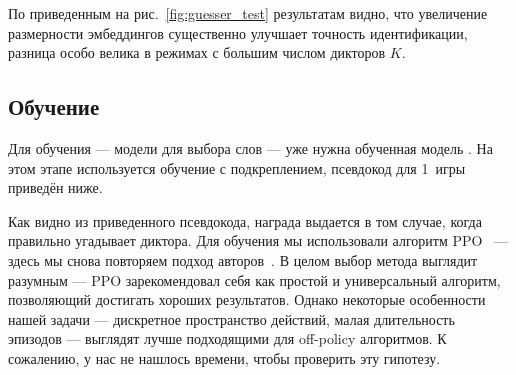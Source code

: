 По приведенным на рис.~\ref{fig:guesser_test} результатам видно, что увеличение размерности
эмбеддингов существенно улучшает точность идентификации, разница особо
велика в режимах с большим числом дикторов $K$.

\subsection{Обучение \enquirer{}}

Для обучения \enquirer{} --- модели для выбора слов --- уже нужна обученная
модель \guesser{}. На этом этапе используется обучение с подкреплением,
псевдокод для 1~игры приведён ниже.

Как видно из приведенного псевдокода, награда выдается в том случае, когда
\guesser{} правильно угадывает диктора. Для обучения мы использовали алгоритм
PPO~\cite{schulman2017proximal} --- здесь мы снова повторяем подход
авторов~\citeisr{}. В целом выбор метода выглядит разумным --- PPO
зарекомендовал себя как простой и универсальный алгоритм, позволяющий достигать
хороших результатов. Однако некоторые особенности нашей задачи --- дискретное
пространство действий, малая длительность эпизодов --- выглядят лучше подходящими
для off-policy алгоритмов. К сожалению, у нас не нашлось времени, чтобы проверить
эту гипотезу.

\newpage


